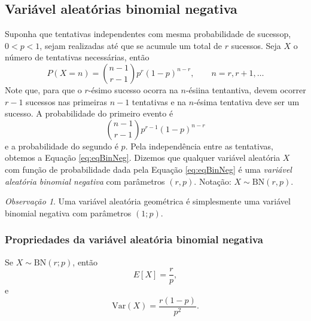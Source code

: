 \documentclass[]{book}
\theoremstyle{definition}
\theoremstyle{definition}
\theoremstyle{definition}
\theoremstyle{remark}
\newtheorem*{remark}{Observação}
\begin{document}
\hypertarget{variuxe1vel-aleatuxf3rias-binomial-negativa}{%
\subsection{Variável aleatórias binomial negativa}\label{variuxe1vel-aleatuxf3rias-binomial-negativa}}

Suponha que tentativas independentes com mesma probabilidade de sucessop, \(0<p<1\), sejam realizadas até que se acumule um total de \(r\) sucessos.
Seja \(X\) o número de tentativas necessárias, então
\begin{equation}
P(X=n) = {n-1 \choose r-1}p^r(1-p)^{n-r}, \qquad n=r,r+1,\ldots
\label{eq:eqBinNeg}
\end{equation}
Note que, para que o \(r\)-ésimo sucesso ocorra na \(n\)-ésiina tentantiva, devem ocorrer \(r-1\) sucessos nas primeiras \(n-1\) tentativas e na \(n\)-ésima tentativa deve ser um sucesso.
A probabilidade do primeiro evento é
\[{n-1 \choose r-1}p^{r-1}(1-p)^{n-r}\]
e a probabilidade do segundo é \(p\).
Pela independência entre as tentativas, obtemos a Equação \eqref{eq:eqBinNeg}.
Dizemos que qualquer variável aleatória \(X\) com função de probabilidade dada pela Equação \eqref{eq:eqBinNeg} é uma \emph{variável aleatória binomial negativa} com parâmetros \((r,p)\).
Notação: \(X\sim\mathrm{BN}(r,p).\)

\begin{remark}
\iffalse{} {Observação. } \fi{}Uma variável aleatória geométrica é simplesmente uma variável binomial negativa com parâmetros \((1; p)\).
\end{remark}

\hypertarget{propriedades-da-variuxe1vel-aleatuxf3ria-binomial-negativa}{%
\subsubsection*{Propriedades da variável aleatória binomial negativa}\label{propriedades-da-variuxe1vel-aleatuxf3ria-binomial-negativa}}

Se \(X\sim\mathrm{BN}(r; p)\), então
\[E[X] = \frac{r}{p},\]
e
\[\mathrm{Var}(X) = \frac{r(1-p)}{p^2}.\]
\end{document}
